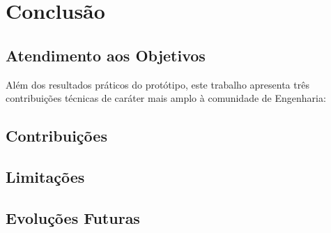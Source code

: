 \chapter{Conclusão} \label{cap:conclusao}


\section{Atendimento aos Objetivos}
Além dos resultados práticos do protótipo, este trabalho apresenta três contribuições
técnicas de caráter mais amplo à comunidade de Engenharia:
 
\section{Contribuições}

\section{Limitações}

\section{Evoluções Futuras}
 
